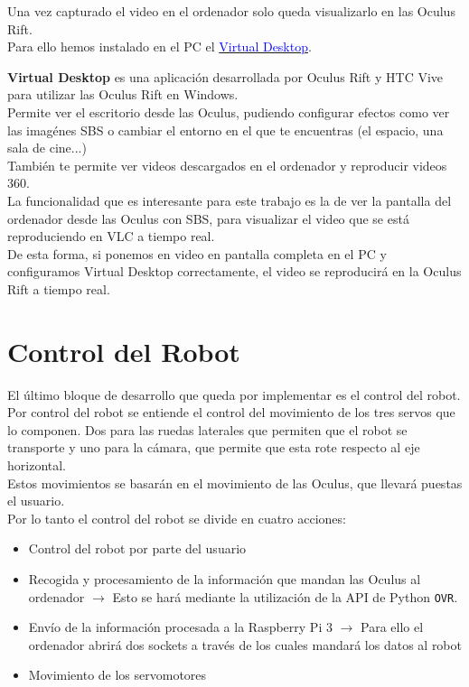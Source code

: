 \documentclass[twoside, 11pt]{epstfg}
\begin{document}
Una vez capturado el video en el ordenador solo queda visualizarlo en las Oculus Rift.\\
Para ello hemos instalado en el PC el \href{http://store.steampowered.com/app/382110/}{\textcolor{blue}{Virtual Desktop}}. 

\textbf{Virtual Desktop} es una aplicación desarrollada por Oculus Rift y  HTC Vive para utilizar las Oculus Rift en Windows.\\
Permite ver el escritorio desde las Oculus, pudiendo configurar efectos como ver las imagénes SBS o cambiar el entorno en el que te encuentras (el espacio, una sala de cine...)\\También te permite ver videos descargados en el ordenador y reproducir videos 360.\\
La funcionalidad que es interesante para este trabajo es la de ver la pantalla del ordenador desde las Oculus con SBS, para visualizar el video que se está reproduciendo en VLC a tiempo real.\\
De esta forma, si ponemos en video en pantalla completa en el PC y configuramos Virtual Desktop correctamente, el video se reproducirá en la Oculus Rift a tiempo real.





\section{Control del Robot}
El último bloque de desarrollo que queda por implementar es el control del robot. Por control del robot se entiende el control del movimiento de los tres servos que lo componen. Dos para las ruedas laterales que permiten que el robot se transporte y uno para la cámara, que permite que esta rote respecto al eje horizontal.\\
Estos movimientos se basarán en el movimiento de las Oculus, que llevará puestas el usuario.\\
Por lo tanto el control del robot se divide en cuatro acciones:
\begin{itemize}
	\item Control del robot por parte del usuario
	\item Recogida y procesamiento de la información que mandan las Oculus al ordenador $\rightarrow$ Esto se hará mediante la utilización de la API de Python \texttt{OVR}.
	
	\item Envío de la información procesada a la Raspberry Pi 3 $\rightarrow$ Para ello el ordenador abrirá dos sockets a través de los cuales mandará los datos al robot
	
	\item Movimiento de los servomotores
\end{itemize}
\end{document}
